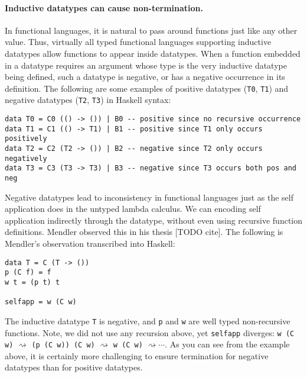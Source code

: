 \documentclass[letterpaper,12pt]{article}
\begin{document}
\paragraph{Inductive datatypes can cause non-termination.}
In functional languages,
it is natural to pass around functions just like any other value.
Thus, virtually all typed functional languages supporting inductive datatypes
allow functions to appear inside datatypes.  When a function
embedded in a datatype requires an argument whose type is the very
inductive datatype being defined, such a datatype is negative,
or has a negative occurrence in its definition.
The following are some examples of positive datatypes (\verb|T0|, \verb|T1|)
and negative datatypes (\verb|T2|, \verb|T3|) in Haskell syntax:
\begin{verbatim}
data T0 = C0 (() -> ()) | B0 -- positive since no recursive occurrence
data T1 = C1 (() -> T1) | B1 -- positive since T1 only occurs positively
data T2 = C2 (T2 -> ()) | B2 -- negative since T2 only occurs negatively 
data T3 = C3 (T3 -> T3) | B3 -- negative since T3 occurs both pos and neg
\end{verbatim}
Negative datatypes lead to inconsistency in functional languages just as
the self application does in the untyped lambda calculus.
We can encoding self application indirectly through the datatype,
without even using recursive function definitions.
Mendler observed this in his thesis [TODO cite].
The following is Mendler's observation transcribed into Haskell:
\begin{verbatim}
data T = C (T -> ())
p (C f) = f
w t = (p t) t

selfapp = w (C w) 
\end{verbatim}
The inductive datatype \verb|T| is negative, and \verb|p| and \verb|w| are
well typed non-recursive functions. Note, we did not use any recursion above,
yet \verb|selfapp| diverges:
\verb|w (C w)| $\rightsquigarrow$ 
\verb|(p (C w)) (C w)|  $\rightsquigarrow$
\verb|w (C w)|  $\rightsquigarrow \cdots$.
As you can see from the example above, it is certainly more
challenging to ensure termination for negative datatypes
than for positive datatypes.
\end{document}
